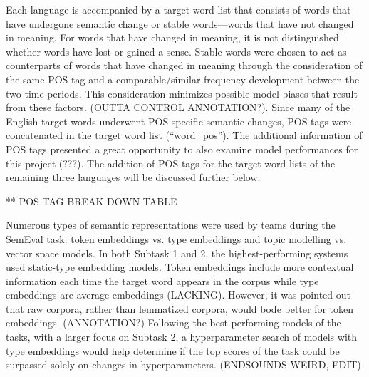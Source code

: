Each language is accompanied by a target word list that consists of words that have undergone semantic change or stable words—words that have not changed in meaning. For words that have changed in meaning, it is not distinguished whether words have lost or gained a sense. Stable words were chosen to act as counterparts of words that have changed in meaning through the consideration of the same POS tag and a comparable/similar frequency development between the two time periods. This consideration minimizes possible model biases that result from these factors. (OUTTA CONTROL ANNOTATION?). Since many of the English target words underwent POS-specific semantic changes, POS tags were concatenated in the target word list (“word\_pos”). The additional information of POS tags presented a great opportunity to also examine model performances for this project (???). The addition of POS tags for the target word lists of the remaining three languages will be discussed further below.
 
** POS TAG BREAK DOWN TABLE

Numerous types of semantic representations were used by teams during the SemEval task: token embeddings vs. type embeddings and topic modelling vs. vector space models. In both Subtask 1 and 2, the highest-performing systems used static-type embedding models. Token embeddings include more contextual information each time the target word appears in the corpus while type embeddings are average embeddings (LACKING). However, it was pointed out that raw corpora, rather than lemmatized corpora, would bode better for token embeddings. (ANNOTATION?) Following the best-performing models of the tasks, with a larger focus on Subtask 2, a hyperparameter search of models with type embeddings would help determine if the top scores of the task could be surpassed solely on changes in hyperparameters. (ENDSOUNDS WEIRD, EDIT)
